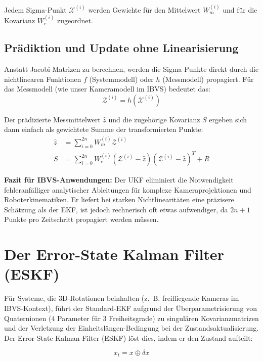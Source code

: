 \documentclass{article}
\begin{document}
Jedem Sigma-Punkt $\mathcal{X}^{(i)}$ werden Gewichte für den Mittelwert $W_m^{(i)}$ und für die Kovarianz $W_c^{(i)}$ zugeordnet.




\subsection{Prädiktion und Update ohne Linearisierung}
Anstatt Jacobi-Matrizen zu berechnen, werden die Sigma-Punkte direkt durch die nichtlinearen Funktionen $f$ (Systemmodell) oder $h$ (Messmodell) propagiert. Für das Messmodell (wie unser Kameramodell im IBVS) bedeutet das:
\begin{equation}
    \mathcal{Z}^{(i)} = h(\mathcal{X}^{(i)})
\end{equation}

Der prädizierte Messmittelwert $\hat{z}$ und die zugehörige Kovarianz $S$ ergeben sich dann einfach als gewichtete Summe der transformierten Punkte:
\begin{align}
    \hat{z} &= \sum_{i=0}^{2n} W_m^{(i)} \mathcal{Z}^{(i)} \\
    S &= \sum_{i=0}^{2n} W_c^{(i)} (\mathcal{Z}^{(i)} - \hat{z})(\mathcal{Z}^{(i)} - \hat{z})^T + R
\end{align}

\textbf{Fazit für IBVS-Anwendungen:} Der UKF eliminiert die Notwendigkeit fehleranfälliger analytischer Ableitungen für komplexe Kameraprojektionen und Roboterkinematiken. Er liefert bei starken Nichtlinearitäten eine präzisere Schätzung als der EKF, ist jedoch rechnerisch oft etwas aufwendiger, da $2n+1$ Punkte pro Zeitschritt propagiert werden müssen.





\section{Der Error-State Kalman Filter (ESKF)}
\label{sec:eskf}

Für Systeme, die 3D-Rotationen beinhalten (z.~B. freifliegende Kameras im IBVS-Kontext), führt der Standard-EKF aufgrund der Überparametrisierung von Quaternionen (4 Parameter für 3 Freiheitsgrade) zu singulären Kovarianzmatrizen und der Verletzung der Einheitslängen-Bedingung bei der Zustandsaktualisierung. Der Error-State Kalman Filter (ESKF) löst dies, indem er den Zustand aufteilt:

\begin{equation}
    x_t = x \oplus \delta x
\end{equation}
\end{document}
